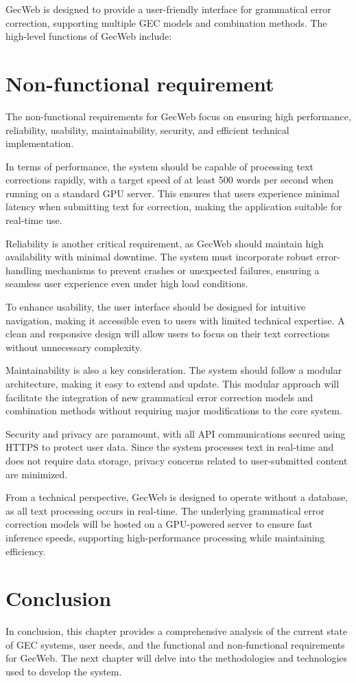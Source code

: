 GecWeb is designed to provide a user-friendly interface for grammatical error correction, supporting multiple GEC models and combination methods.
The high-level functions of GecWeb include:

\section{Non-functional requirement}
\label{non-functional-requirement}

The non-functional requirements for GecWeb focus on ensuring high performance, reliability, usability, maintainability, security, and efficient technical implementation.

In terms of performance, the system should be capable of processing text corrections rapidly, with a target speed of at least 500 words per second when running on a standard GPU server.
This ensures that users experience minimal latency when submitting text for correction, making the application suitable for real-time use.

Reliability is another critical requirement, as GecWeb should maintain high availability with minimal downtime.
The system must incorporate robust error-handling mechanisms to prevent crashes or unexpected failures, ensuring a seamless user experience even under high load conditions.

To enhance usability, the user interface should be designed for intuitive navigation, making it accessible even to users with limited technical expertise.
A clean and responsive design will allow users to focus on their text corrections without unnecessary complexity.

Maintainability is also a key consideration.
The system should follow a modular architecture, making it easy to extend and update.
This modular approach will facilitate the integration of new grammatical error correction models and combination methods without requiring major modifications to the core system.

Security and privacy are paramount, with all API communications secured using HTTPS to protect user data.
Since the system processes text in real-time and does not require data storage, privacy concerns related to user-submitted content are minimized.

From a technical perspective, GecWeb is designed to operate without a database, as all text processing occurs in real-time.
The underlying grammatical error correction models will be hosted on a GPU-powered server to ensure fast inference speeds, supporting high-performance processing while maintaining efficiency.

\section{Conclusion}
\label{conclusion}

In conclusion, this chapter provides a comprehensive analysis of the current state of GEC systems, user needs, and the functional and non-functional requirements for GecWeb.
The next chapter will delve into the methodologies and technologies used to develop the system.
